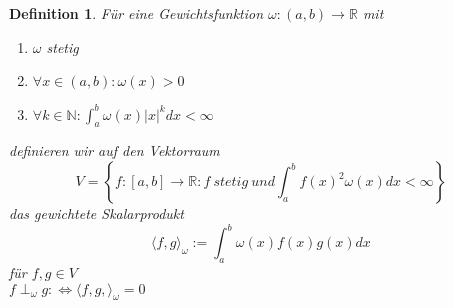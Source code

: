\documentclass[12pt]{article}
\theoremstyle{break}
\newtheorem{definition}[theorem]{Definition}
\begin{document}
\begin{definition}
Für eine Gewichtsfunktion $\omega : (a, b) \rightarrow \mathbb{R}$ mit 
\begin{enumerate}
  \item $\omega$ stetig
  \item $\forall x\in(a,b): \omega(x) > 0 $
  \item $\forall k \in \mathbb{N}: \int_a^b \omega(x) \vert x \vert^k dx < \infty$
\end{enumerate}
definieren wir auf den Vektorraum 
$$ V = \left\{ f: [a,b] \rightarrow \mathbb{R}: f \medspace stetig \medspace und \int_a^b f(x)^2 \omega(x) dx < \infty \right\} $$
das gewichtete Skalarprodukt
$$ \langle f, g \rangle_\omega := \int_a^b \omega(x)f(x)g(x)dx$$
für $f, g \in V$ \\
$f \perp_\omega g :\Leftrightarrow \langle f, g, \rangle_\omega = 0$
\end{definition}
\end{document}

